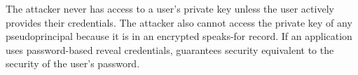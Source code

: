 %



%
%
The attacker never has access to a user's private key unless the user actively
provides their credentials.
%
The attacker also cannot access the private key of any pseudoprincipal because
it is in an encrypted speaks-for record.
%
%
If an application uses password-based reveal credentials, \sys
guarantees security equivalent to the security of the user's password.
